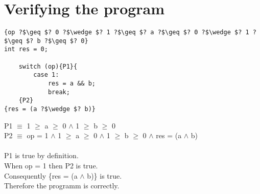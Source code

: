 \documentclass[11pt, a4paper, titlepage, block]{article}
\begin{document}
\section{Verifying the program}
\lstset{numbers=left, tabsize=2, escapechar=?}
\begin{lstlisting}
{op ?$\geq $? 0 ?$\wedge $? 1 ?$\geq $? a ?$\geq $? 0 ?$\wedge $? 1 ?$\geq $? b ?$\geq $? 0}
int res = 0;
	
	switch (op){P1}{
		case 1:
			res = a && b;
			break;
	{P2}
{res = (a ?$\wedge $? b)}

\end{lstlisting}
P1 $\equiv $ 1 $\geq $ a $\geq $ 0 $\wedge $ 1 $\geq $ b $\geq $ 0\\
P2 $\equiv $ op = 1 $\wedge $ 1 $\geq $ a $\geq $ 0 $\wedge $ 1 $\geq $ b $\geq $ 0 $\wedge $ res = (a $\wedge $ b)\\
\\
P1 is true by definition.\\
When {op = 1} then P2 is true.\\
Consequently \{res = (a $\wedge $ b)\} is true.\\
Therefore the programm is correctly.
\end{document}
